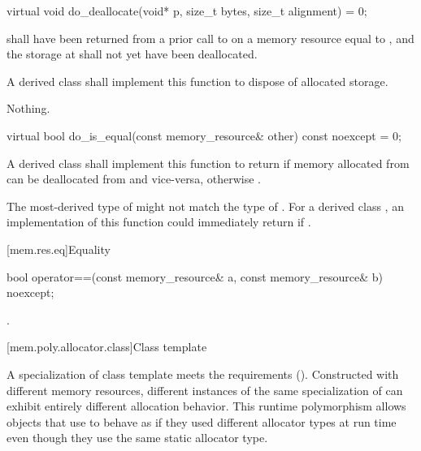 %
\begin{itemdecl}
virtual void do_deallocate(void* p, size_t bytes, size_t alignment) = 0;
\end{itemdecl}

\begin{itemdescr}
\pnum
\requires
{} shall have been returned from a prior call to  on a memory resource equal to ,
and the storage at  shall not yet have been deallocated.

\pnum
\effects
A derived class shall implement this function to dispose of allocated storage.

\pnum
\throws
Nothing.
\end{itemdescr}

%
\begin{itemdecl}
virtual bool do_is_equal(const memory_resource& other) const noexcept = 0;
\end{itemdecl}

\begin{itemdescr}
\pnum
\returns
A derived class shall implement this function to return  if memory allocated from  can be deallocated from  and vice-versa,
otherwise .
\begin{note}
The most-derived type of  might not match the type of .
For a derived class , an implementation of this function
could immediately return 
if .
\end{note}
\end{itemdescr}

[mem.res.eq]{Equality}

%
\begin{itemdecl}
bool operator==(const memory_resource& a, const memory_resource& b) noexcept;
\end{itemdecl}

\begin{itemdescr}
\pnum
\returns
{}.
\end{itemdescr}

[mem.poly.allocator.class]{Class template }

\pnum
A specialization of class template 
meets the  requirements ().
Constructed with different memory resources,
different instances of the same specialization of 
can exhibit entirely different allocation behavior.
This runtime polymorphism allows objects that use 
to behave as if they used different allocator types at run time
even though they use the same static allocator type.

